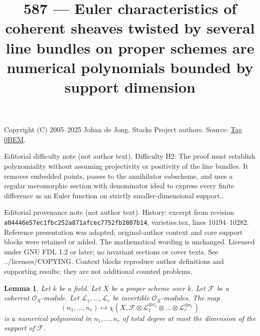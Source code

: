\documentclass{amsart}
\theoremstyle{plain}
\newtheorem{lemma}[subsection]{Lemma}
\theoremstyle{definition}
\theoremstyle{remark}
\numberwithin{equation}{subsection}
\begin{document}
\title[Stacks Project, Tag 0BEM]{587 --- Euler characteristics of coherent sheaves twisted by several line bundles on proper schemes are numerical polynomials bounded by support dimension}
\maketitle
\noindent Copyright (C) 2005--2025 Johan de Jong. Stacks Project authors. Source: \href{https://stacks.math.columbia.edu/tag/0BEM}{Tag 0BEM}.

\noindent Editorial difficulty note (not author text). Difficulty H2: The proof must establish polynomiality without assuming projectivity or positivity of the line bundles. It removes embedded points, passes to the annihilator subscheme, and uses a regular meromorphic section with denominator ideal to express every finite difference as an Euler function on strictly smaller-dimensional support..

\noindent Editorial provenance note (not author text). History: excerpt from revision \texttt{a0444\allowbreak 6e57e\allowbreak c1fbc\allowbreak 252a8\allowbreak 71afc\allowbreak ec775\allowbreak 2fb28\allowbreak 07b14}, varieties.tex, lines 10194--10282. Reference presentation was adapted; original-author context and core support blocks were retained or added. The mathematical wording is unchanged. Licensed under GNU FDL 1.2 or later; no invariant sections or cover texts. See ../licenses/COPYING. Context blocks reproduce author definitions and supporting results; they are not additional counted problems.

\begin{lemma}
\label{lemma-numerical-polynomial-from-euler}
Let $k$ be a field. Let $X$ be a proper scheme over $k$. Let $\mathcal{F}$
be a coherent $\mathcal{O}_X$-module. Let
$\mathcal{L}_1, \ldots, \mathcal{L}_r$ be invertible $\mathcal{O}_X$-modules.
The map
$$
(n_1, \ldots, n_r) \longmapsto
\chi(X, \mathcal{F} \otimes
\mathcal{L}_1^{\otimes n_1} \otimes \ldots \otimes
\mathcal{L}_r^{\otimes n_r})
$$
is a numerical polynomial in $n_1, \ldots, n_r$ of total degree at
most the dimension of the support of $\mathcal{F}$.
\end{lemma}
\end{document}
